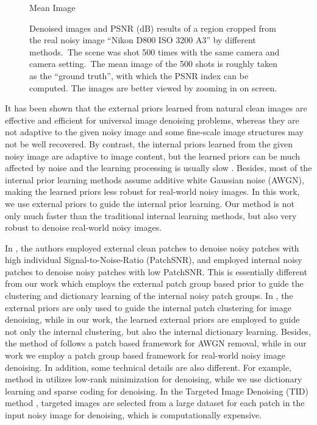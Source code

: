 \begin{figure}
{\begin{minipage}[t]{0.19\textwidth}
{\footnotesize Mean Image}
\end{minipage}
}
\caption{Denoised images and PSNR (dB) results of a region cropped from the real noisy image ``Nikon D800 ISO 3200 A3'' \cite{crosschannel2016} by different methods.\ The scene was shot 500 times with the same camera and camera setting.\ The mean image of the 500 shots is roughly taken as the ``ground truth'', with which the PSNR index can be computed. The images are better viewed by zooming in on screen.}
    \label{fig3-1}
\end{figure}

It has been shown \cite{foe,epll,pgpd} that the external priors learned from natural clean images are effective and efficient for universal image denoising problems, whereas they are not adaptive to the given noisy image and some fine-scale image structures may not be well recovered. By contrast, the internal priors learned from the given noisy image are adaptive to image content, but the learned priors can be much affected by noise and the learning processing is usually slow \cite{blsgsm,zhou2012nonparametric,ksvd,lssc,ncsr}. Besides, most of the internal prior learning methods \cite{blsgsm,zhou2012nonparametric,ksvd,lssc,ncsr} assume additive white Gaussian noise (AWGN), making the learned priors less robust for real-world noisy images. In this work, we use external priors to guide the internal prior learning. Our method is not only much faster than the traditional internal learning methods, but also very robust to denoise real-world noisy images.

In \cite{combexin}, the authors employed external clean patches to denoise noisy patches with high individual Signal-to-Noise-Ratio (PatchSNR), and employed internal noisy patches to denoise noisy patches with low PatchSNR. This is essentially different from our work which employs the external patch group based prior to guide the clustering and dictionary learning of the internal noisy patch groups. In \cite{external}, the external priors are only used to guide the internal patch clustering for image denoising, while in our work, the learned external priors are employed to guide not only the internal clustering, but also the internal dictionary learning. Besides, the method of \cite{external} follows a patch based framework for AWGN removal, while in our work we employ a patch group based framework for real-world noisy image denoising. In addition, some technical details are also different. For example, method in \cite{external} utilizes low-rank minimization for denoising, while we use dictionary learning and sparse coding for denoising. In the Targeted Image Denoising (TID) method \cite{tid}, targeted images are selected from a large dataset for each patch in the input noisy image for denoising, which is computationally expensive.

